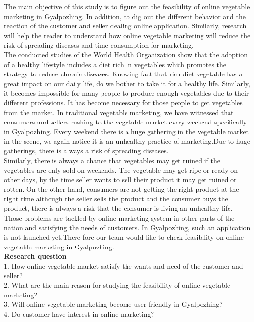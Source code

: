 \documentclass[12pt]{report}
\begin{document}
\begin{normalsize}
The main objective of this study is to figure out the feasibility of online vegetable marketing in
Gyalpozhing. In addition, to dig out the different behavior and the reaction of the customer and
seller dealing online application. Similarly, research will help the reader to understand how online
vegetable marketing will reduce the risk of spreading diseases and time consumption for marketing. \newline\\[0.1cm]
The conducted studies of the World Health Organization show that the adoption of a healthy
lifestyle includes a diet rich in vegetables which promotes the strategy to reduce chronic diseases.
Knowing fact that rich diet vegetable has a great impact on our daily life, do we bother to take it
for a healthy life. Similarly, it becomes impossible for many people to produce enough vegetables
due to their different professions. It has become necessary for those people to get vegetables from
the market. In traditional vegetable marketing, we have witnessed that consumers and sellers
rushing to the vegetable market every weekend specifically in Gyalpozhing. Every weekend there is
a huge gathering in the vegetable market in the scene, we again notice it is an unhealthy practice
of marketing.Due to huge gatherings, there is always a risk of spreading diseases.\newline\\[0.1cm] 
Similarly, there is always a chance that vegetables may get ruined if the vegetables are only sold on weekends. The vegetable
may get ripe or ready on other days, by the time seller wants to sell their product it may get
ruined or rotten. On the other hand, consumers are not getting the right product at the right time
although the seller sells the product and the consumer buys the product, there is always a risk
that the consumer is living an unhealthy life. Those problems are tackled by online marketing system in
other parts of the nation and  satisfying the needs of customers. In Gyalpozhing,
such an application is not launched yet.There fore our team would like to check feasibility on online vegetable marketing in Gyalpozhing. \newline\\[0.1cm]

{\bfseries Research question}\newline\\[0.1cm]
1. How online vegetable market satisfy the wants and need of the customer and seller?\newline\\[0.1cm] 
2. What are the main reason for studying the feasibility of online vegetable marketing?\newline\\[0.1cm] 
3. Will online vegetable marketing become user friendly in Gyalpozhing?\newline\\[0.1cm] 
4. Do customer have interest in online marketing?\newline\\[0.1cm] 




\end{normalsize}
\end{document}
